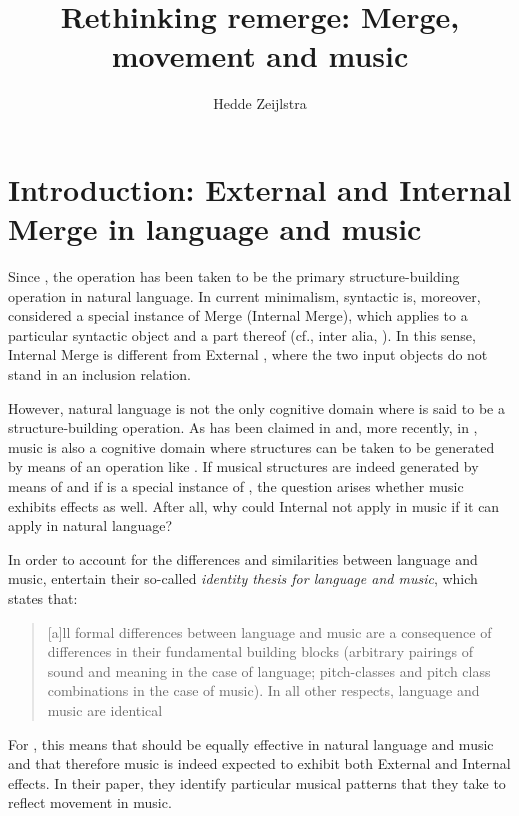 \documentclass[output=paper]{langsci/langscibook}
\author{Hedde Zeijlstra\affiliation{Georg-August-Universität Göttingen}}
\title{Rethinking remerge: Merge, movement and music}
\begin{document}
\glsresetall{}

\section{Introduction: External and Internal Merge in language and
music}\label{sec:key:26.1}

Since \citet{Chomsky1995}, the operation  has been taken to be the
primary structure-building operation in natural language. In current
minimalism, syntactic  is, moreover, considered a special instance of
Merge (Internal Merge), which applies to a particular syntactic object and a
part thereof (cf., inter alia, \citealt{Chomsky2005}). In this sense, Internal
Merge is different from External , where the two input objects do
not stand in an inclusion relation.

However, natural language is not the only cognitive domain where  is
said to be a structure-building operation. As has been claimed in
\citet{LerJac1983} and, more recently, in \citet{KatzPes2011}, music is also a
cognitive domain where structures can be taken to be generated by means of an
operation like . If musical structures are indeed generated by means
of  and if  is a special instance of , the
question arises whether music exhibits  effects as well. After all, why
could Internal  not apply in music if it can apply in natural
language?

In order to account for the differences and similarities between language and
music, \citet{KatzPes2011} entertain their so-called \emph{identity thesis for
language and music}, which states
that:

\blockquote[{\citealt[3]{KatzPes2011}}][.]{[a]ll formal differences
    between language and music are a consequence of differences in their
    fundamental building blocks (arbitrary pairings of sound and meaning in the
    case of language; pitch-classes and pitch class combinations in the case of
music). In all other   respects, language and music are identical}

For \citeauthor{KatzPes2011}, this means that  should be equally
effective in natural language and music and that therefore music is indeed
expected to exhibit both External and Internal  effects. In their
paper, they identify particular musical patterns that they take to reflect
movement in music.
\end{document}
